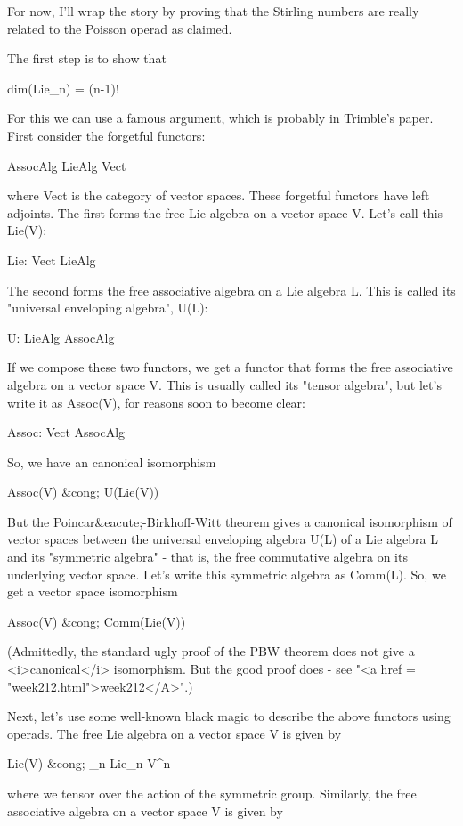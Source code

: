 For now, I'll wrap the story by proving that the Stirling numbers
are really related to the Poisson operad as claimed.

The first step is to show that

dim(Lie_{n}) = (n-1)!  

For this we can use a famous argument, which is probably in Trimble's
paper.  First consider the forgetful functors:

AssocAlg \to  LieAlg \to  Vect

where Vect is the category of vector spaces.  These forgetful functors
have left adjoints.  The first forms the free Lie algebra on a vector
space V.  Let's call this Lie(V):

Lie: Vect \to  LieAlg

The second forms the free associative algebra on a Lie algebra L.
This is called its "universal enveloping algebra", U(L):

U: LieAlg \to  AssocAlg

If we compose these two functors, we get a functor that forms the free
associative algebra on a vector space V.  This is usually called its
"tensor algebra", but let's write it as Assoc(V), for reasons
soon to become clear:

Assoc: Vect \to  AssocAlg

So, we have an canonical isomorphism

Assoc(V) &cong; U(Lie(V))

But the Poincar&eacute;-Birkhoff-Witt theorem gives a canonical
isomorphism of vector spaces between the universal enveloping algebra
U(L) of a Lie algebra L and its "symmetric algebra" - that
is, the free commutative algebra on its underlying vector space.
Let's write this symmetric algebra as Comm(L).  So, we get a vector
space isomorphism

Assoc(V) &cong; Comm(Lie(V))

(Admittedly, the standard ugly proof of the PBW theorem does not give
a <i>canonical</i> isomorphism.  But the good proof does - see
"<a href = "week212.html">week212</A>".)

Next, let's use some well-known black magic to describe the above
functors using operads.  The free Lie algebra on a vector space V is
given by

Lie(V) &cong; \oplus _{n} Lie_{n} \otimes 
V^{\otimes n}

where we tensor over the action of the symmetric group.  Similarly,
the free associative algebra on a vector space V is given by

